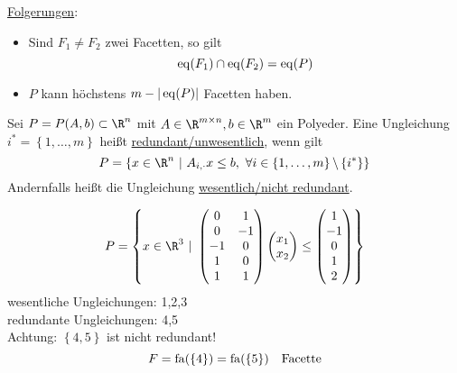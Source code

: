 \underline{Folgerungen}:\nl
\begin{itemize}
	\item Sind $F_{1} \neq F_{2}$ zwei Facetten, so gilt
		\begin{equation*}
			\operatorname{eq}(F_{1}) \cap \operatorname{eq}(F_{2}) = \operatorname{eq}(P)
		\end{equation*}
	\item $P$ kann höchstens $m-|\operatorname{eq}(P)|$ Facetten haben.
\end{itemize}
\begin{definition}
	Sei $P = P(A,b) \subset \R^n$ mit $A \in \R^{m \times n}, b \in \R^m$ ein Polyeder.
	Eine Ungleichung $i^* = \left\{1,\dots ,m \right\}$ heißt \underline{redundant/unwesentlich}, wenn gilt
	\begin{equation*}
		P = \left\{ x \in \R^n\ |\ A_{i,\cdot}x \leq b,\ \forall i\in\left\{1,\dots ,m \right\}\backslash \left\{i^* \right\} \right\}
	\end{equation*}
	Andernfalls heißt die Ungleichung \underline{wesentlich/nicht redundant}.
\end{definition}
\begin{beispiel}
	\begin{align*}
		P = \left\{ x \in \R^3\ |\ 
			\begin{pmatrix}
				0 & 1 \\
				0 & -1 \\
				-1 & 0 \\
				1 & 0 \\
				1 & 1 
			\end{pmatrix}
			\begin{pmatrix}
				x_{1}\\
				x_{2}
			\end{pmatrix}
			\leq 
			\begin{pmatrix}
				1\\
				-1\\
				0\\
				1\\
				2
			\end{pmatrix}
		 \right\}
	\end{align*}
	wesentliche Ungleichungen: 1,2,3\\
	redundante Ungleichungen: 4,5\\
	Achtung: $\left\{4,5 \right\}$ ist nicht redundant!
	\begin{equation*}
		F = \operatorname{fa}(\left\{4 \right\}) = \operatorname{fa}(\left\{5 \right\}) \quad \text{Facette}
	\end{equation*}
\end{beispiel}
